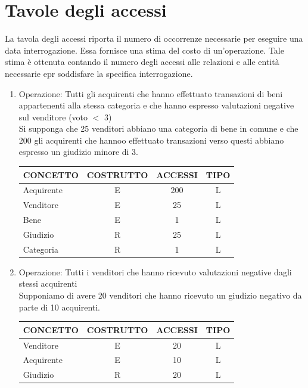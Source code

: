 \documentclass[a4paper, 10pt]{report}
\begin{document}
\section{Tavole degli accessi}
La tavola degli accessi riporta il numero di occorrenze necessarie per eseguire una data interrogazione. Essa fornisce una stima del costo di un'operazione. Tale stima \`e ottenuta contando il numero degli accessi alle relazioni e alle entit\`a necessarie epr soddisfare la specifica interrogazione.
\begin{enumerate}
\item Operazione: Tutti gli acquirenti che hanno effettuato transazioni di beni appartenenti alla stessa categoria e che hanno espresso valutazioni negative sul venditore (voto $<$ 3)\\
Si supponga che 25 venditori abbiano una categoria di bene in comune e che 200 gli acquirenti che hannoo effettuato transazioni verso questi abbiano espresso un giudizio minore di 3.
\begin{table}[h!]
\centering
\begin{tabular}{|l|c|c|c|}
\hline
\textbf{CONCETTO}&\textbf{COSTRUTTO}&\textbf{ACCESSI}&\textbf{TIPO}\\
\hline
Acquirente & E & 200 & L\\
\hline
Venditore & E & 25 & L\\
\hline
Bene & E & 1 & L\\
\hline
Giudizio & R & 25 & L\\
\hline
Categoria & R & 1 & L\\
\hline
\end{tabular}
\end{table}

\item Operazione: Tutti i venditori che hanno ricevuto valutazioni negative dagli stessi acquirenti\\
Supponiamo di avere 20 venditori che hanno ricevuto un giudizio negativo da parte di 10 acquirenti.
\begin{table}[h!]
\centering
\begin{tabular}{|l|c|c|c|}
\hline
\textbf{CONCETTO}&\textbf{COSTRUTTO}&\textbf{ACCESSI}&\textbf{TIPO}\\
\hline
Venditore & E & 20 & L\\
\hline
Acquirente & E & 10 & L\\
\hline
Giudizio & R & 20 & L\\
\hline
\end{tabular}
\end{table}


\end{enumerate}
\end{document}
